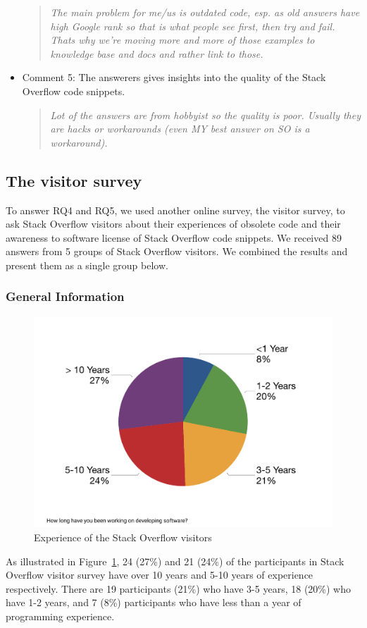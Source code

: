\documentclass{svjour3}                     %
\begin{document}
\begin{itemize}[label={}]
	\begin{quote}\textit{The main problem for me/us is outdated code, esp. as old
			answers have high Google rank so that is what people see first, then try and
			fail. Thats why we're moving more and more of those examples to knowledge base
			and docs and rather link to those.}\end{quote}
	
	\item Comment 5: The answerers gives insights into the quality of the Stack
	Overflow code snippets.
	
	\begin{quote}\textit{Lot of the answers are from hobbyist so the quality is
			poor. Usually they are hacks or workarounds (even MY best answer on SO is a
			workaround).}\end{quote} \end{itemize}

\subsection{The visitor survey}

To answer RQ4 and RQ5, we used another online survey, the visitor survey, to ask
Stack Overflow visitors about their experiences of obsolete code and their
awareness to software license of Stack Overflow code snippets. We received 89
answers from 5 groups of Stack Overflow visitors. We combined the results and
present them as a single group below.

\subsubsection*{General Information}

\begin{figure}
		\centering
		\includegraphics[width=0.4\linewidth]{survey_visitor_exp}
		\caption{Experience of the Stack Overflow visitors}
		\label{fig:survey_visitor_exp}
\end{figure}

As illustrated in Figure~\ref{fig:survey_visitor_exp}, 24 (27\%) and 21 (24\%)
of the participants in Stack Overflow visitor survey have over 10 years and 5-10
years of experience respectively. There are 19 participants (21\%) who have 3-5
years, 18 (20\%) who have 1-2 years, and 7 (8\%) participants who have less than a
year of programming experience.
\end{document}
